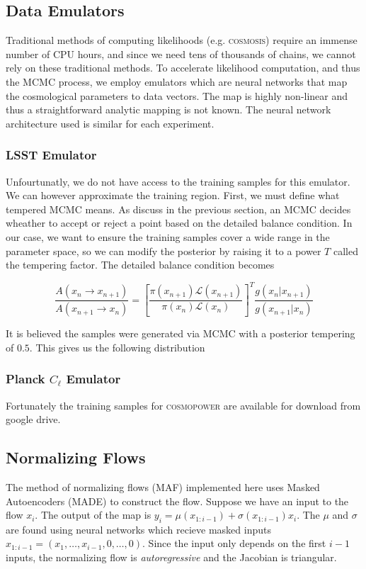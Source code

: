 \subsection{Data Emulators}

Traditional methods of computing likelihoods (e.g. \textsc{cosmosis}) require an immense number of CPU hours, and since we need tens of thousands of chains, we cannot rely on these traditional methods. To accelerate likelihood computation, and thus the MCMC process, we employ emulators which are neural networks that map the cosmological parameters to data vectors. The map is highly non-linear and thus a straightforward analytic mapping is not known. The neural network architecture used is similar for each experiment.

\subsubsection{LSST Emulator}
Unfourtunatly, we do not have access to the training samples for this emulator. We can however approximate the training region. First, we must define what tempered MCMC means. As discuss in the previous section, an MCMC decides wheather to accept or reject a point based on the detailed balance condition. In our case, we want to ensure the training samples cover a wide range in the parameter space, so we can modify the posterior by raising it to a power $T$ called the tempering factor. The detailed balance condition becomes

\[ \frac{A(x_n \rightarrow x_{n+1})}{A(x_{n+1}\rightarrow x_{n})} = \left[\frac{\pi(x_{n+1}) \mathcal{L}(x_{n+1})}{\pi(x_n)\mathcal{L}(x_n)}\right]^T \frac{ g(x_{n}|x_{n+1}) }{ g(x_{n+1}|x_n)} \]

It is believed the samples were generated via MCMC with a posterior tempering of $0.5$. This gives us the following distribution

\subsubsection{Planck $C_\ell$ Emulator}

Fortunately the training samples for \textsc{cosmopower} are available for download from google drive.

\subsection{Normalizing Flows}

The method of normalizing flows (MAF) implemented here uses Masked Autoencoders (MADE) to construct the flow. Suppose we have an input to the flow $x_i$. The output of the map is $y_i= \mu(x_{1:i-1})+\sigma(x_{1:i-1})x_i$. The $\mu$ and $\sigma$ are found using neural networks which recieve masked inputs $x_{1:i-1}=(x_1,\ldots,x_{i-1},0,\ldots,0)$. Since the input only depends on the first $i-1$ inputs, the normalizing flow is \textit{autoregressive} and the Jacobian is triangular.

